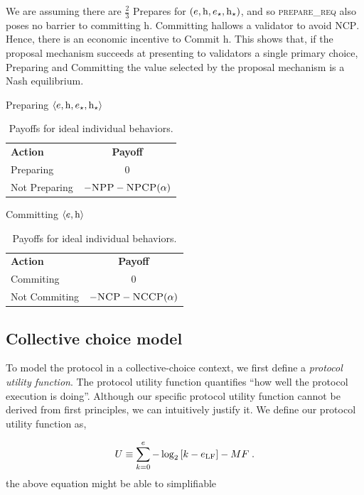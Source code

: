 \documentclass[12pt, final]{article}
\newcommand*{\todo}[1]{\color{red} #1}
\newcommand{\epoch}{\ensuremath{e}\space}
\newcommand{\hash}{\textnormal{h}\space}
\newcommand{\epochsource}{\ensuremath{\epoch_{\star}}\space}
\newcommand{\hashsource}{\ensuremath{\hash_{\star}}\space}
\newcommand{\epochLF}{\ensuremath{\epoch_{\textnormal{LF}}}\space}
\newcommand{\NCP}{\textsc{NCP}\space}
\newcommand{\NCCP}{\textsc{NCCP}\space}
\newcommand{\NPP}{\textsc{NPP}\space}
\newcommand{\NPCP}{\textsc{NPCP}\space}
\begin{document}
We are assuming there are $\frac{2}{3}$ Prepares for $(\epoch, \hash, \epochsource, \hashsource)$, and so \textsc{prepare\_req} also poses no barrier to committing \hash. Committing \hash allows a validator to avoid \NCP. Hence, there is an economic incentive to Commit \hash. This shows that, if the proposal mechanism succeeds at presenting to validators a single primary choice, Preparing and Committing the value selected by the proposal mechanism is a Nash equilibrium.


\begin{table}[h!bt]
	\centering
   
	Preparing $\langle \epoch, \hash, \epochsource, \hashsource \rangle$  
    { \begin{tabular}{l c}
	\textbf{Action} & \textbf{Payoff} \\
	Preparing & 0 \\
	Not Preparing & $-\NPP - \NPCP(\alpha)$ \\
	\end{tabular}} \hspace{0.5in} Committing $\langle \epoch, \hash \rangle$ 
    { \begin{tabular}{l c} 
	\textbf{Action} & \textbf{Payoff} \\
	Commiting & 0 \\
	Not Commiting & $-\NCP - \NCCP(\alpha)$ \\
	\end{tabular} 
	\label{tbl:commit} }	
	\caption{Payoffs for ideal individual behaviors.}
	\label{fig:individualpayoffs}
\end{table}


\subsection{Collective choice model}
\label{sect:collectivechoice}
To model the protocol in a collective-choice context, we first define a \emph{protocol utility function}. The protocol utility function quantifies ``how well the protocol execution is doing''. Although our specific protocol utility function cannot be derived from first principles, we can intuitively justify it. We define our protocol utility function as,

\begin{equation}
U \equiv \sum_{k = 0}^{\epoch} - \log_2\left[ k - \epochLF \right] - M F \; .
\label{eq:utilityfunction}
\end{equation}
\todo{the above equation might be able to simplifiable}
\end{document}
